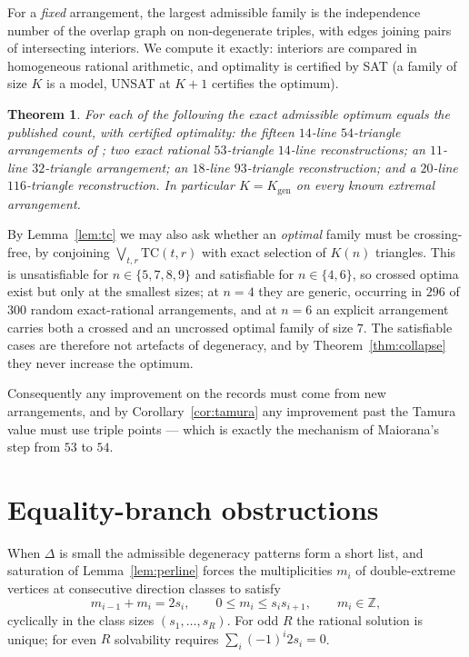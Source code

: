 \documentclass[11pt]{article}
\newtheorem{theorem}{Theorem}
\theoremstyle{definition}
\newcommand{\Kgen}{K_{\mathrm{gen}}}
\begin{document}
For a \emph{fixed} arrangement, the largest admissible family is the
independence number of the overlap graph on non-degenerate triples, with
edges joining pairs of intersecting interiors. We compute it exactly:
interiors are compared in homogeneous rational arithmetic, and optimality is
certified by SAT (a family of size $K$ is a model, UNSAT at $K+1$ certifies
the optimum).

\begin{theorem}\label{thm:census}
For each of the following the exact admissible optimum equals the published
count, with certified optimality: the fifteen $14$-line $54$-triangle
arrangements of \cite{Maiorana}; two exact rational $53$-triangle $14$-line
reconstructions; an $11$-line $32$-triangle arrangement; an $18$-line
$93$-triangle reconstruction; and a $20$-line $116$-triangle reconstruction.
In particular $K=\Kgen$ on every known extremal arrangement.
\end{theorem}

By Lemma~\ref{lem:tc} we may also ask whether an \emph{optimal} family must
be crossing-free, by conjoining $\bigvee_{t,r}\mathrm{TC}(t,r)$ with exact
selection of $K(n)$ triangles. This is unsatisfiable for
$n\in\{5,7,8,9\}$ and satisfiable for $n\in\{4,6\}$, so crossed optima exist
but only at the smallest sizes; at $n=4$ they are generic, occurring in
$296$ of $300$ random exact-rational arrangements, and at $n=6$ an explicit
arrangement carries both a crossed and an uncrossed optimal family of size
$7$. The satisfiable cases are therefore not artefacts of degeneracy, and by
Theorem~\ref{thm:collapse} they never increase the optimum.

Consequently any improvement on the records must come from new arrangements,
and by Corollary~\ref{cor:tamura} any improvement past the Tamura value must
use triple points --- which is exactly the mechanism of Maiorana's step from
$53$ to $54$.

\section{Equality-branch obstructions}

When $\Delta$ is small the admissible degeneracy patterns form a short list,
and saturation of Lemma~\ref{lem:perline} forces the multiplicities $m_i$ of
double-extreme vertices at consecutive direction classes to satisfy
\begin{equation}\label{eq:cycle}
 m_{i-1}+m_i=2s_i,\qquad 0\le m_i\le s_is_{i+1},\qquad m_i\in\mathbb Z,
\end{equation}
cyclically in the class sizes $(s_1,\dots,s_R)$. For odd $R$ the rational
solution is unique; for even $R$ solvability requires
$\sum_i(-1)^i 2s_i=0$.
\end{document}
